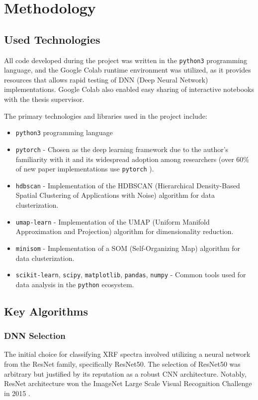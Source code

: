 \section{Methodology}
\subsection{Used Technologies}

All code developed during the project was written in the \texttt{python3} programming language, and the Google Colab runtime environment was utilized, as it provides resources that allows rapid testing of DNN (Deep Neural Network) implementations. 
Google Colab also enabled easy sharing of interactive notebooks with the thesis supervisor.

The primary technologies and libraries used in the project include:
\begin{itemize}
    \item \texttt{python3} programming language
    \item \texttt{pytorch} - Chosen as the deep learning framework due to the author's familiarity with it and its widespread adoption among researchers (over 60\% of new paper implementations use \texttt{pytorch} \cite{papersWithCodeTrends}).
    \item \texttt{hdbscan} - Implementation of the HDBSCAN (Hierarchical Density-Based Spatial Clustering of Applications with Noise) algorithm for data clusterization.
    \item \texttt{umap-learn} - Implementation of the UMAP (Uniform Manifold Approximation and Projection) algorithm for dimensionality reduction.
    \item \texttt{minisom} - Implementation of a SOM (Self-Organizing Map) algorithm for data clusterization.
    \item \texttt{scikit-learn}, \texttt{scipy}, \texttt{matplotlib}, \texttt{pandas}, \texttt{numpy} - Common tools used for data analysis in the \texttt{python} ecosystem.
\end{itemize}

\subsection{Key Algorithms}
\subsubsection{DNN Selection}

The initial choice for classifying XRF spectra involved utilizing a neural network from the ResNet family, specifically ResNet50. The selection of ResNet50 was arbitrary but justified by its reputation as a robust CNN architecture. Notably, ResNet architecture won the ImageNet Large Scale Visual Recognition Challenge in 2015 \cite{ImageNet2015}.

